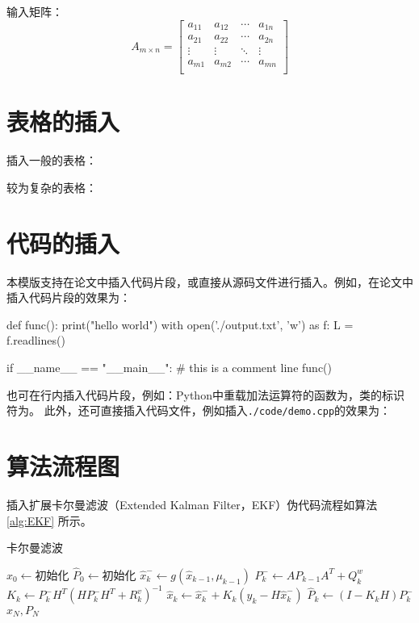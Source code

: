 输入矩阵：
\begin{equation}
	\label{eqn:matrix}
	A_{m\times n}=
	\left[ {\begin{array}{cccc}
			a_{11} & a_{12} & \cdots & a_{1n}\\
			a_{21} & a_{22} & \cdots & a_{2n}\\
			\vdots & \vdots & \ddots & \vdots\\
			a_{m1} & a_{m2} & \cdots & a_{mn}\\
	\end{array}}\right]
\end{equation}

\section{表格的插入}
\label{sec:table}
插入一般的表格：


较为复杂的表格：


\section{代码的插入}
\label{sec:code}
本模版支持在论文中插入代码片段，或直接从源码文件进行插入。例如，在论文中插入代码片段的效果为：
\begin{python}
def func():
print("hello world")
with open('./output.txt', 'w') as f:
L = f.readlines()
	
if __name__ == "__main__":
# this is a comment line
func()
\end{python}
也可在行内插入代码片段，例如：Python中重载加法运算符的函数为，类的标识符为。
此外，还可直接插入代码文件，例如插入\texttt{./code/demo.cpp}的效果为：


\section{算法流程图}
插入扩展卡尔曼滤波（Extended Kalman Filter，EKF）伪代码流程如算法 \ref{alg:EKF} 所示。
\begin{algorithm}[H]
    \caption{卡尔曼滤波}
    \label{alg:EKF}
    \begin{algorithmic}[htbp]
        \Statex
        \State $\hat{x}_{0} \gets \text{初始化}$
        \State $\hat{P}_{0} \gets \text{初始化}$
        \State $ \hat{x}_{k}^{-} \gets g(\hat{x}_{k-1},\mu _{k-1})$
        \State $ P_{k}^{-} \gets A P_{k-1} A^T + Q^w_k $
        \State $ K_k \gets P_{k}^{-} H^T ( H P_{k}^{-} H^T + R^v_k )^{-1} $
        \State $ \hat{x}_k \gets \hat{x}_{k}^{-} + K_k\left( y_k - H \hat{x}_{k}^{-} \right) $
        \State $ \hat{P}_k \gets \left( I - K_k H \right) P_{k}^{-} $
        \EndFor
        \State \Return $ \hat{x}_N, P_N $
        \EndFunction
    \end{algorithmic}
\end{algorithm}